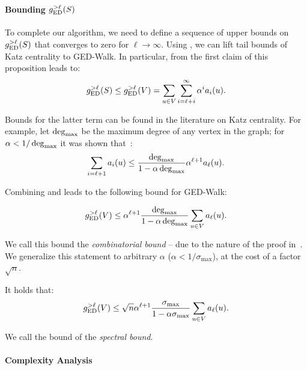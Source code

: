 \paragraph{Bounding $g_{\text{ED}}^{>\ell}(S)$}
%
To complete our algorithm, we need to define a sequence of upper bounds
on $g_{\text{ED}}^{>\ell}(S)$ that converges to zero for $\ell \to \infty$.
Using , we can lift tail bounds
of Katz centrality to GED-Walk. In particular, from the first claim
of this proposition leads to:
%
\begin{equation}
\label{eq:ged-walk:tail-bound}
g_{\text{ED}}^{>\ell}(S) \le g_{\text{ED}}^{>\ell}(V) = \sum_{u \in V}\sum_{i = \ell + i}^{\infty} \alpha^i a_i(u).
\end{equation}

Bounds for the latter term can be found in the literature on Katz centrality.
For example, let $\deg_{\max}$ be the maximum degree of any vertex in the graph;
for $\alpha < 1 / \deg_{\max}$ it was shown
that~\cite{DBLP:conf/esa/GrintenBGBM18}:
%
\begin{equation}
\label{eq:ged-walk:katz-bound}
\sum_{i = \ell + 1}a_i(u) \le \frac{\deg_{\max}}{1 - \alpha\deg_{\max}}\alpha^{\ell + 1}a_{\ell}(u).
\end{equation}

Combining  and 
leads to the following bound for GED-Walk:

\begin{equation}
\label{eq:ged-walk:combinatorial-bound}
g_{\text{ED}}^{>\ell}(V) \le \alpha^{\ell + 1} \frac{\deg_{\max}}{1 - \alpha\deg_{\max}}\sum_{u \in V}a_{\ell}(u).
\end{equation}

We call this bound the \emph{combinatorial bound} -- due to the nature
of the proof in~\cite{DBLP:conf/esa/GrintenBGBM18}.
We generalize this statement to arbitrary $\alpha$ (\ie $\alpha < 1 / \sigma_{\max}$),
at the cost of a factor $\sqrt{n}$.

\begin{lemma}
\label{lemma:ged-walk:spectral-bound}
It holds that:
%
\begin{equation}
\label{eq:ged-walk:spectral-bound}
g_{\text{ED}}^{>\ell}(V) \le \sqrt{n}\alpha^{\ell + 1}\frac{\sigma_{\max}}{1 - \alpha\sigma_{\max}}
\sum_{u \in V}a_{\ell}(u).
\end{equation}
\end{lemma}

We call the bound of  the \emph{spectral bound}.


\paragraph{Complexity Analysis}
%


